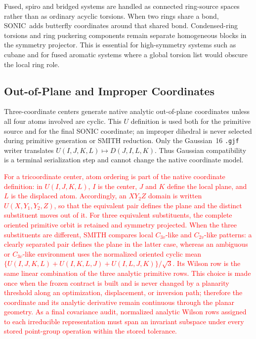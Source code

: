 \documentclass[journal=jctcce,manuscript=article,layout=traditional]{achemso}
\newcommand{\SONIC}{SONIC}
\theoremstyle{definition}
\begin{document}
Fused, spiro and bridged systems are handled as connected ring-source spaces
rather than as ordinary acyclic torsions.  When two rings share a bond, \SONIC\
adds butterfly coordinates around that shared bond.  Condensed-ring torsions
and ring puckering components remain separate homogeneous blocks in the
symmetry projector.  This is essential for high-symmetry systems such as cubane
and for fused aromatic systems where a global torsion list would obscure the
local ring role.

\subsection{Out-of-Plane and Improper Coordinates}

Three-coordinate centers generate native analytic out-of-plane coordinates
unless all four atoms involved are cyclic.  This \(U\) definition is used both
for the primitive source and for the final SONIC coordinate; an improper
dihedral is never selected during primitive generation or SMITH reduction.  Only
the Gaussian~16 \texttt{.gjf} writer translates
\(U(I,J,K,L)\mapsto D(J,I,L,K)\).  Thus Gaussian compatibility is a terminal
serialization step and cannot change the native coordinate model.

\textcolor{red}{For a tricoordinate center, atom ordering is part of the
native coordinate definition: in $U(I,J,K,L)$, $I$ is the center,
$J$ and $K$ define the local plane, and $L$ is the displaced atom.
Accordingly, an $XY_2Z$ domain is written $U(X,Y_1,Y_2,Z)$, so that the
equivalent pair defines the plane and the distinct substituent moves out of
it.  For three equivalent substituents, the complete oriented primitive orbit
is retained and symmetry projected.  When the three substituents are
different, SMITH compares local $C_{3v}$-like and $C_{2v}$-like patterns:
a clearly separated pair defines the plane in the latter case, whereas an
ambiguous or $C_{3v}$-like environment uses the normalized oriented cyclic mean
$\{U(I,J,K,L)+U(I,K,L,J)+U(I,L,J,K)\}/\sqrt{3}$.  Its Wilson row is the same
linear combination of the three analytic primitive rows.  This choice is
made once when the frozen contract is built and is never changed by a
planarity threshold along an optimization, displacement, or inversion path;
therefore the coordinate and its analytic derivative remain continuous
through the planar geometry.  As a final covariance audit, normalized
analytic Wilson rows assigned to each irreducible representation must span an
invariant subspace under every stored point-group operation within the stored
tolerance.}
\end{document}
